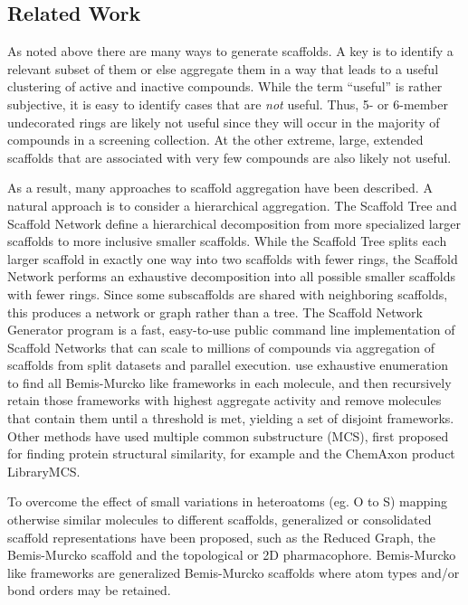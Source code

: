 \documentclass[journal=jacsat,manuscript=article]{achemso}
\begin{document}
\subsection{Related Work}
As noted above there are many ways to generate scaffolds. A key is to identify a relevant subset of them or else aggregate them in a way that leads to a useful clustering of active and inactive compounds. While the term ``useful'' is rather subjective, it is easy to identify cases that are \emph{not} useful. Thus, 5- or 6-member undecorated rings are likely not useful since they will occur in the majority of compounds in a screening collection. At the other extreme, large, extended scaffolds that are associated with very few compounds are also likely not useful. 

As a result, many approaches to scaffold aggregation have been described. A natural approach is to consider a hierarchical aggregation. The Scaffold Tree\cite{Ertl2011ScaffoldTree} and Scaffold Network\cite{Varin2011ScafNet} define a hierarchical decomposition from more specialized larger scaffolds to more inclusive smaller scaffolds. While the Scaffold Tree splits each larger scaffold in exactly one way into two scaffolds with fewer rings, the Scaffold Network performs an exhaustive decomposition into all possible smaller scaffolds with fewer rings.  Since some subscaffolds are shared with neighboring scaffolds, this produces a network or graph rather than a tree. The Scaffold Network Generator program\cite{Matlock2013SNG} is a fast, easy-to-use public command line implementation of Scaffold Networks that can scale to millions of compounds via aggregation of scaffolds from split datasets and parallel execution.  \citeauthor{Harper2004DDclus} use exhaustive enumeration to find all Bemis-Murcko like frameworks in each molecule, and then recursively retain those frameworks with highest aggregate activity and remove molecules that contain them until a threshold is met, yielding a set of disjoint frameworks.   Other methods have used multiple common substructure (MCS), first proposed for finding protein structural similarity\cite{Koch1997MCSprot}, for example \cite{Quintus2009MCS} and the ChemAxon product LibraryMCS. 

To overcome the effect of small variations in heteroatoms (eg. O to S) mapping 
otherwise similar molecules to different scaffolds, generalized or consolidated scaffold representations have been proposed, such as the Reduced Graph\cite{Barker2003RG}, the Bemis-Murcko scaffold\cite{BemisMurcko1996} and the topological or 2D pharmacophore\cite{Schneider1999ScafHopTP}. Bemis-Murcko like frameworks \cite{Harper2004DDclus} are generalized Bemis-Murcko scaffolds where atom types and/or bond orders may be retained.    
\end{document}
